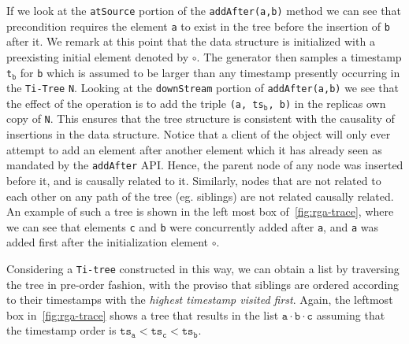 If we look at the \lstinline|atSource| portion of the
\lstinline|addAfter(a,b)| method we can see that precondition requires
the element \lstinline|a| to exist in the tree before the insertion of
\lstinline|b| after it.
%
We remark at this point that the data structure is initialized with a
preexisting initial element denoted by $\circ$.
%
The generator then samples a timestamp \lstinline|t|$_{\mathtt{b}}$
for \lstinline|b| which is assumed to be larger than any
timestamp presently occurring in the \lstinline|Ti-Tree|
\lstinline|N|.
%
Looking at the \lstinline|downStream| portion of
\lstinline|addAfter(a,b)| we see that the effect of the operation is
to add the triple \lstinline|(a, ts|$_{\mathtt{b}}$\lstinline|, b)|
in the replicas own copy of \lstinline|N|.
%
This ensures that the tree structure is consistent with the causality
of insertions in the data structure.
%
Notice that a client of the object will only ever attempt to add an
element after another element which it has already seen as mandated by
the \lstinline|addAfter| API.
%
Hence, the parent node of any node was inserted before it, and is
causally related to it.
%
Similarly, nodes that are not related to each other on any path of
the tree (eg. siblings) are not related causally related.
%
An example of such a tree is shown in the left most box
of~\autoref{fig:rga-trace}, where we can see that
elements \lstinline|c| and \lstinline|b| were concurrently added after
\lstinline|a|, and \lstinline|a| was added first after the
initialization element $\circ$.

Considering a \lstinline|Ti-tree| constructed in this way, we can
obtain a list by traversing the tree in pre-order fashion, with the
proviso that siblings are ordered according to their timestamps with
the \emph{highest timestamp visited first}.
%
Again, the leftmost box in~\autoref{fig:rga-trace} shows a tree that
results in the list $\mathtt{a \cdot b \cdot c}$ assuming that the
timestamp order is $\mathtt{ts_a < ts_c < ts_b}$.

